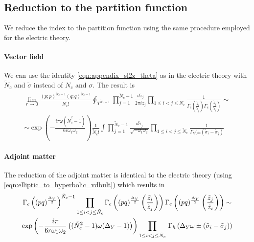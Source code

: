 \subsection{Reduction to the partition function}
We reduce the index to the partition function using the same procedure employed for the electric theory.

\paragraph{Vector field}
We can use the identity \eqref{eqn:appendix_sl2z_theta} as in the electric theory with $\tilde{N}_c$ and $\tilde{\sigma}$ instead of $N_c$ and $\sigma$.  The result is
\begin{multline}
\lim_{r \rightarrow 0} \frac{ (p;p)^{\tilde{N}_c- 1}(q;q)^{\tilde{N}_c- 1} }{ \tilde{N}_c ! }
\oint_{T^{\tilde{N}_c -1}} \prod_{j=1}^{\tilde{N}_c -1 } \frac{ d \tilde{z}_j}{2 \pi i \tilde{z}_j} \prod_{1 \leq i<j \leq \tilde{N}_c } \frac{1}{\Gamma_e( \frac{\tilde{z}_i}{\tilde{z}_j} )\Gamma_e( \frac{\tilde{z}_j}{\tilde{z}_i} )} \sim
\\
\sim 
\exp \left(  
- \frac{ i \pi \omega (\tilde{N}_c^2 -1)}{6 r \omega_1 \omega_2}
\right)
 \frac{1}{\tilde{N}_c !} \int \prod_{j=1}^{\tilde{N}_c -1 } \frac{d \tilde{\sigma}_j}{\sqrt{- \omega_1 \omega_2} } \prod_{1 \leq i<j \leq \tilde{N}_c }\frac{1}{\Gamma_h( \pm (\tilde{\sigma}_i - \tilde{\sigma}_j) }
\end{multline}

\paragraph{Adjoint matter}
The reduction of the adjoint matter is identical to the electric theory (using \eqref{eqn:elliptic_to_hyperbolic_vdbult}) which results in
\begin{multline}
 \Gamma_e \left((pq)^{\frac{\Delta_Y}{2}} \right)^{\tilde{N}_c -1} 
 \prod_{1 \leq i <j \leq \tilde{N}_c} 
\Gamma_e \left( (pq)^{\frac{\Delta_Y}{2}} \left( { \tilde{z}_i \over \tilde{z}_j} \right) \right) \Gamma_e \left( (pq)^{\frac{\Delta_Y}{2}} \left( { \tilde{z}_j \over \tilde{z}_i} \right) \right) \sim \\
 \exp \left(- \frac{i \pi} {6 r \omega_1 \omega_2 }  \left( (\tilde{N}_c^2-1) \omega (\Delta_Y - 1)  \right) \right)   \prod_{1 \leq i <j \leq \tilde{N}_c} 
	\, \Gamma_h \left( \Delta_Y \omega \pm (\tilde{\sigma}_i - \tilde{\sigma}_j) \right) 
\end{multline}

